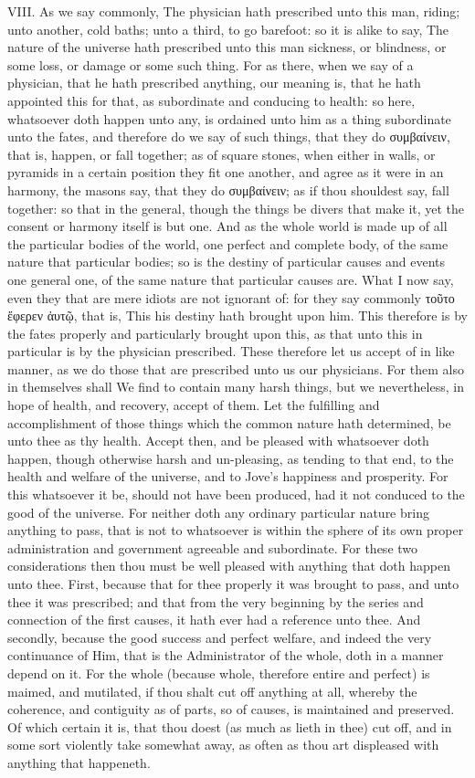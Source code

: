 VIII. As we say commonly, The physician hath prescribed unto this man,
riding; unto another, cold baths; unto a third, to go barefoot: so it is
alike to say, The nature of the universe hath prescribed unto this man
sickness, or blindness, or some loss, or damage or some such thing. For
as there, when we say of a physician, that he hath prescribed anything,
our meaning is, that he hath appointed this for that, as subordinate and
conducing to health: so here, whatsoever doth happen unto any, is
ordained unto him as a thing subordinate unto the fates, and therefore do
we say of such things, that they do
συμβαίνειν, that is,
happen, or fall together; as of square stones, when either in walls, or
pyramids in a certain position they fit one another, and agree as it were
in an harmony, the masons say, that they do
συμβαίνειν; as if thou
shouldest say, fall together: so that in the general, though the things
be divers that make it, yet the consent or harmony itself is but one. And
as the whole world is made up of all the particular bodies of the world,
one perfect and complete body, of the same nature that particular bodies;
so is the destiny of particular causes and events one general one, of the
same nature that particular causes are. What I now say, even they that
are mere idiots are not ignorant of: for they say commonly
τοῦτο ἔφερεν
ἀυτῷ, that is, This his destiny hath brought upon
him. This therefore is by the fates properly and particularly brought
upon this, as that unto this in particular is by the physician
prescribed. These therefore let us accept of in like manner, as we do
those that are prescribed unto us our physicians. For them also in
themselves shall We find to contain many harsh things, but we
nevertheless, in hope of health, and recovery, accept of them. Let the
fulfilling and accomplishment of those things which the common nature
hath determined, be unto thee as thy health. Accept then, and be pleased
with whatsoever doth happen, though otherwise harsh and un-pleasing, as
tending to that end, to the health and welfare of the universe, and to
Jove's happiness and prosperity. For this whatsoever it be, should not
have been produced, had it not conduced to the good of the universe. For
neither doth any ordinary particular nature bring anything to pass, that
is not to whatsoever is within the sphere of its own proper
administration and government agreeable and subordinate. For these two
considerations then thou must be well pleased with anything that doth
happen unto thee. First, because that for thee properly it was brought to
pass, and unto thee it was prescribed; and that from the very beginning
by the series and connection of the first causes, it hath ever had a
reference unto thee. And secondly, because the good success and perfect
welfare, and indeed the very continuance of Him, that is the
Administrator of the whole, doth in a manner depend on it. For the whole
(because whole, therefore entire and perfect) is maimed, and mutilated,
if thou shalt cut off anything at all, whereby the coherence, and
contiguity as of parts, so of causes, is maintained and preserved. Of
which certain it is, that thou doest (as much as lieth in thee) cut off,
and in some sort violently take somewhat away, as often as thou art
displeased with anything that happeneth.

